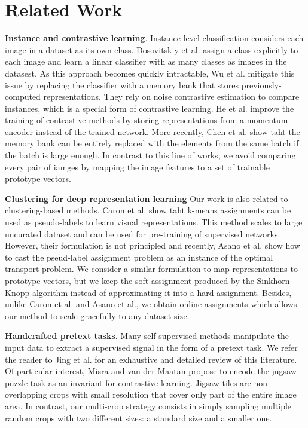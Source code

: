 \documentclass[conference]{IEEEtran}
\begin{document}
\section{Related Work}
\textbf{Instance and contrastive learning}. Instance-level classification considers each image in a dataset as its own class. Dosovitskiy et al. assign a class explicitly to each image and learn a linear classifier with as many classes as images in the datasest.
As this approach becomes quickly intractable, Wu et al. mitigate this issue by replacing the classifier with a memory bank that stores previously-computed representations.
They rely on noise contrastive estimation to compare instances, which is a special form of contrastive learning. He et al. improve the training of contrastive methods by storing representations from a momentum encoder instead of the trained network.
More recently, Chen et al. show taht the memory bank can be entirely replaced with the elements from the same batch if the batch is large enough.
In contrast to this line of works, we avoid comparing every pair of iamges by mapping the image features to a set of trainable prototype vectors.

\textbf{Clustering for deep representation learning} Our work is also related to clustering-based methods. Caron et al. show taht k-means assignments can be used as pseudo-labels to learn visual representations.
This method scales to large uncurated dataset and can be used for pre-training of supervised networks. 
However, their formulation is not principled and recently, Asano et al. show how to cast the pseud-label assignment problem as an instance of the optimal transport problem.
We consider a similar formulation to map representations to prototype vectors, but we keep the soft assignment produced by the Sinkhorn-Knopp algorithm instead of approximating it into a hard assignment.
Besides, unlike Caron et al. and Asano et al., we obtain online assignments which allows our method to scale gracefully to any dataset size.

\textbf{Handcrafted pretext tasks}. Many self-supervised methods manipulate the input data to extract a supervised signal in the form of a pretext task.
We refer the reader to Jing et al. for an exhaustive and detailed review of this literature. Of particular interest, Misra and van der Maatan propose to encode the jugsaw puzzle task as an invariant for contrastive learning.
Jigsaw tiles are non-overlapping crops with small resolution that cover only part of the entire image area. In contrast, our multi-crop strategy consists in simply sampling multiple random crops with two different sizes: a standard size and a smaller one.
\end{document}
